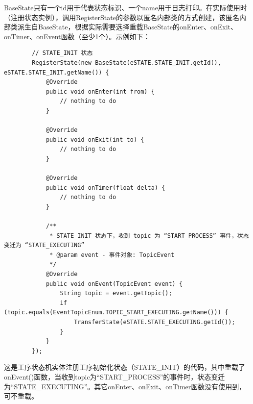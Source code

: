 BaseState只有一个id用于代表状态标识、一个name用于日志打印。在实际使用时（注册状态实例），调用RegisterState的参数以匿名内部类的方式创建，该匿名内部类派生自BaseState，根据实际需要选择重载BaseState的onEnter、onExit、onTimer、onEvent函数（至少1个）。示例如下：
\begin{lstlisting}
        // STATE_INIT 状态
        RegisterState(new BaseState(eSTATE.STATE_INIT.getId(), eSTATE.STATE_INIT.getName()) {
            @Override
            public void onEnter(int from) {
                // nothing to do
            }

            @Override
            public void onExit(int to) {
                // nothing to do
            }

            @Override
            public void onTimer(float delta) {
                // nothing to do
            }

            /**
             * STATE_INIT 状态下，收到 topic 为 “START_PROCESS” 事件，状态变迁为 “STATE_EXECUTING”
             * @param event - 事件对象: TopicEvent
             */
            @Override
            public void onEvent(TopicEvent event) {
                String topic = event.getTopic();
                if (topic.equals(EventTopicEnum.TOPIC_START_EXECUTING.getName())) {
                    TransferState(eSTATE.STATE_EXECUTING.getId());
                }
            }
        });
\end{lstlisting}\vspace{-30pt}
这是工序状态机实体注册工序初始化状态（STATE\_INIT）的代码，其中重载了onEvent()函数，当收到topic为“START\_PROCESS”的事件时，状态变迁为“STATE\_EXECUTING”。其它onEnter、onExit、onTimer函数没有使用到，可不重载。


